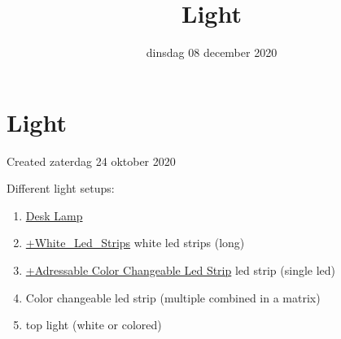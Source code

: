 \documentclass{scrartcl}
\title{Light}
\date{dinsdag 08 december 2020}
\author{}
\begin{document}
\maketitle

		\section{Light}

Created zaterdag 24 oktober 2020



Different light setups:

\begin{enumerate}[1]
\item \href{./Light/Desk_Lamp_Test.tex}{Desk Lamp}
\item \href{./Light/White_Led_Strips.tex}{+White\_Led\_Strips} white led strips (long) 
\item \href{./Light/Adressable_Color_Changeable_Led_Strip.tex}{+Adressable Color Changeable Led Strip}  led strip (single led)
\item Color changeable led strip (multiple combined in a matrix)
\item top light (white or colored)
\end{enumerate}
\end{document}
